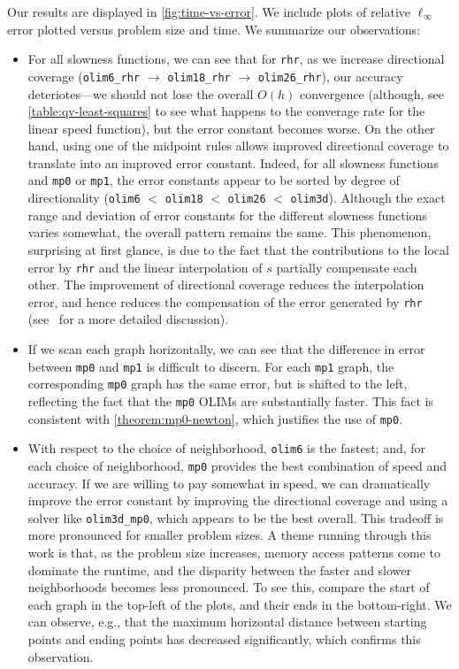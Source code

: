 \documentclass[sisc-eikonal.tex]{subfiles}
\begin{document}
Our results are displayed in \cref{fig:time-vs-error}. We include
plots of relative $\ell_\infty$ error plotted versus problem size and
time. We summarize our observations:
\begin{itemize}
\item For all slowness functions, we can see that for \texttt{rhr}, as
  we increase directional coverage (\texttt{olim6\_rhr} $\to$
  \texttt{olim18\_rhr} $\to$ \texttt{olim26\_rhr}), our accuracy
  deteriotes---we should not lose the overall $O(h)$ convergence
  (although, see \cref{table:qv-least-squares} to see what happens to
  the converage rate for the linear speed function), but the error
  constant becomes worse. On the other hand, using one of the midpoint
  rules allows improved directional coverage to translate into an
  improved error constant. Indeed, for all slowness functions and
  \texttt{mp0} or \texttt{mp1}, the error constants appear to be
  sorted by degree of directionality (\texttt{olim6} $<$
  \texttt{olim18} $<$ \texttt{olim26} $<$ \texttt{olim3d}). Although
  the exact range and deviation of error constants for the different
  slowness functions varies somewhat, the overall pattern remains the
  same. This phenomenon, surprising at first glance, is due to the
  fact that the contributions to the local error by \texttt{rhr} and
  the linear interpolation of $s$ partially compensate each other. The
  improvement of directional coverage reduces the interpolation error,
  and hence reduces the compensation of the error generated by
  \texttt{rhr} (see~\cite{yang2019computing} for a more detailed
  discussion).
\item If we scan each graph horizontally, we can see that the
  difference in error between \texttt{mp0} and \texttt{mp1} is
  difficult to discern. For each \texttt{mp1} graph, the corresponding
  \texttt{mp0} graph has the same error, but is shifted to the left,
  reflecting the fact that the \texttt{mp0} OLIMs are substantially
  faster. This fact is consistent with \cref{theorem:mp0-newton}, which
  justifies the use of \texttt{mp0}.
\item With respect to the choice of neighborhood, \texttt{olim6} is
  the fastest; and, for each choice of neighborhood, \texttt{mp0}
  provides the best combination of speed and accuracy. If we are
  willing to pay somewhat in speed, we can dramatically improve the
  error constant by improving the directional coverage and using a
  solver like \texttt{olim3d\_mp0}, which appears to be the best
  overall. This tradeoff is more pronounced for smaller problem
  sizes. A theme running through this work is that, as the problem
  size increases, memory access patterns come to dominate the runtime,
  and the disparity between the faster and slower neighborhoods
  becomes less pronounced. To see this, compare the start of each
  graph in the top-left of the plots, and their ends in the
  bottom-right. We can observe, e.g., that the maximum horizontal
  distance between starting points and ending points has decreased
  significantly, which confirms this observation.
\end{itemize}
\end{document}
